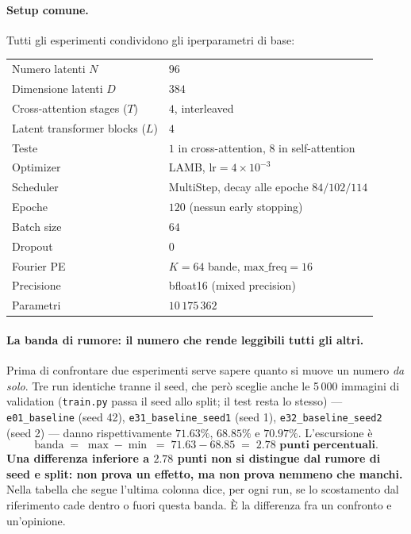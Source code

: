 \documentclass[
  11pt,
]{article}
\begin{document}
\paragraph{Setup comune.} Tutti gli esperimenti condividono gli iperparametri di base:

\begin{center}
{\small
\begin{tabular}{@{}ll@{}}
\toprule
Numero latenti $N$ & $96$ \\
Dimensione latenti $D$ & $384$ \\
Cross-attention stages ($T$) & $4$, interleaved \\
Latent transformer blocks ($L$) & $4$ \\
Teste & $1$ in cross-attention, $8$ in self-attention \\
Optimizer & LAMB, $\text{lr} = 4 \times 10^{-3}$ \\
Scheduler & MultiStep, decay alle epoche $84 / 102 / 114$ \\
Epoche & $120$ (nessun early stopping) \\
Batch size & $64$ \\
Dropout & $0$ \\
Fourier PE & $K=64$ bande, $\text{max\_freq}=16$ \\
Precisione & bfloat16 (mixed precision) \\
Parametri & $10\,175\,362$ \\
\bottomrule
\end{tabular}
}
\end{center}

\paragraph{La banda di rumore: il numero che rende leggibili tutti gli altri.}
Prima di confrontare due esperimenti serve sapere quanto si muove un numero \emph{da solo}. Tre run identiche tranne il seed, che però sceglie anche le 5\,000 immagini di validation (\texttt{train.py} passa il seed allo split; il test resta lo stesso) --- \texttt{e01\_baseline} (seed 42), \texttt{e31\_baseline\_seed1} (seed 1), \texttt{e32\_baseline\_seed2} (seed 2) --- danno rispettivamente $71.63\%$, $68.85\%$ e $70.97\%$. L'escursione è
\[
  \text{banda} \;=\; \max - \min \;=\; 71.63 - 68.85 \;=\; \mathbf{2.78 \text{ punti percentuali}}.
\]
\textbf{Una differenza inferiore a $2.78$ punti non si distingue dal rumore di seed e split: non prova un effetto, ma non prova nemmeno che manchi.} Nella tabella che segue l'ultima colonna dice, per ogni run, se lo scostamento dal riferimento cade dentro o fuori questa banda. È la differenza fra un confronto e un'opinione.
\end{document}

